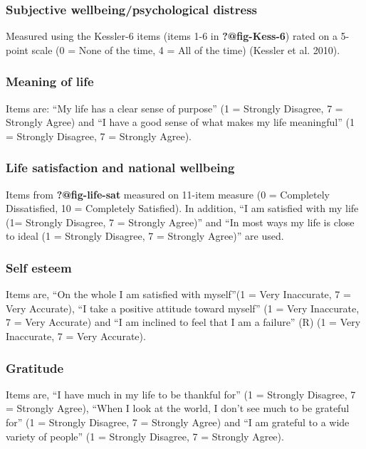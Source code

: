 \documentclass[
]{interact}
\begin{document}
\subsubsection{Subjective wellbeing/psychological
distress}\label{subjective-wellbeingpsychological-distress}

Measured using the Kessler-6 items (items 1-6 in \textbf{?@fig-Kess-6})
rated on a 5-point scale (0 = None of the time, 4 = All of the time)
(Kessler et al. 2010).

\subsubsection{Meaning of life}\label{meaning-of-life}

Items are: ``My life has a clear sense of purpose'' (1 = Strongly
Disagree, 7 = Strongly Agree) and ``I have a good sense of what makes my
life meaningful'' (1 = Strongly Disagree, 7 = Strongly Agree).

\subsubsection{Life satisfaction and national
wellbeing}\label{life-satisfaction-and-national-wellbeing}

Items from \textbf{?@fig-life-sat} measured on 11-item measure (0 =
Completely Dissatisfied, 10 = Completely Satisfied). In addition, ``I am
satisfied with my life (1= Strongly Disagree, 7 = Strongly Agree)'' and
``In most ways my life is close to ideal (1 = Strongly Disagree, 7 =
Strongly Agree)'' are used.

\subsubsection{Self esteem}\label{self-esteem}

Items are, ``On the whole I am satisfied with myself''(1 = Very
Inaccurate, 7 = Very Accurate), ``I take a positive attitude toward
myself'' (1 = Very Inaccurate, 7 = Very Accurate) and ``I am inclined to
feel that I am a failure'' (R) (1 = Very Inaccurate, 7 = Very Accurate).

\subsubsection{Gratitude}\label{gratitude}

Items are, ``I have much in my life to be thankful for'' (1 = Strongly
Disagree, 7 = Strongly Agree), ``When I look at the world, I don't see
much to be grateful for'' (1 = Strongly Disagree, 7 = Strongly Agree)
and ``I am grateful to a wide variety of people'' (1 = Strongly
Disagree, 7 = Strongly Agree).
\end{document}

